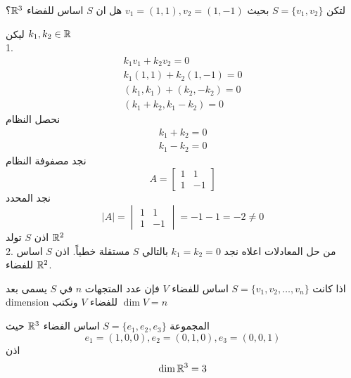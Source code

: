 \begin{example}
	لتكن $ S =\{v_1, v_2\}$ بحيث $v_1 = (1,1) , v_2=(1,-1)$ هل ان $S$ اساس للفضاء $\mathbb{R}^3$؟
\end{example}
\begin{solution}
	ليكن $k_1, k_2\in \mathbb{R}$ \\
	1.
	\begin{gather*}
		k_1 v_1+ k_2 v_2 = 0\\
		k_1(1,1) + k_2(1,-1) =0\\
		(k_1,k_1) + (k_2,-k_2) = 0\\
		(k_1+k_2, k_1-k_2) =0 
	\end{gather*}
	نحصل النظام
	\begin{align*}
		k_1 + k_2 = 0\\
		k_1 - k_2 = 0
	\end{align*}
	نجد مصفوفة النظام
	\[
	A =
	\begin{bmatrix}
		1 & 1\\
		1 & -1
	\end{bmatrix}
	\]
	نجد المحدد
	\[
	|A| = 
	\begin{vmatrix}
		1 & 1\\
		1 & -1
	\end{vmatrix} = -1-1=-2\neq 0
	\]
	اذن $S$ تولد $\mathbb{R}^2$ \\
	2. من حل المعادلات اعلاه نجد $k_1=k_2=0$ بالتالي $S$ مستقلة خطياً. اذن $S$ اساس للفضاء $\mathbb{R}^2$.
\end{solution}

\begin{definition}
	اذا كانت $S = \{v_1, v_2, \dots, v_n\}$ اساس للفضاء $V$ فإن عدد المتجهات $n$ في $S$ يسمى بعد dimension للفضاء $V$ ونكتب $\dim V = n$
\end{definition}

\begin{example}
	المجموعة $S = \{e_1, e_2,e_3\}$ اساس الفضاء $\mathbb{R}^3$ حيث
	\[
	e_1 = (1,0,0), e_2 = (0,1,0) , e_3 = (0,0,1)
	\]
	اذن 
	\[
	\dim \mathbb{R}^3 = 3
	\]
\end{example}

